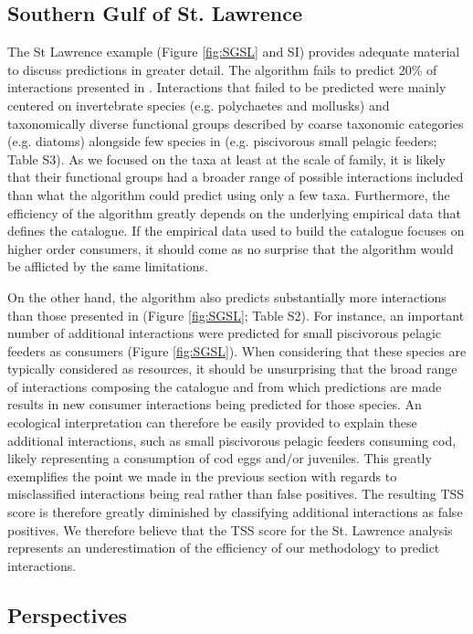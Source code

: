 \subsection{Southern Gulf of St. Lawrence}
The St Lawrence example (Figure \ref{fig:SGSL} and SI) provides adequate material to discuss predictions in greater detail. The algorithm fails to predict 20\% of interactions presented in \citet{savenkoff2004}. Interactions that failed to be predicted were mainly centered on invertebrate species (e.g. polychaetes and mollusks) and taxonomically diverse functional groups described by coarse taxonomic categories (e.g. diatoms) alongside few species in \citet{savenkoff2004} (e.g. piscivorous small pelagic feeders; Table S3). As we focused on the taxa at least at the scale of family, it is likely that their functional groups had a broader range of possible interactions included than what the algorithm could predict using only a few taxa. Furthermore, the efficiency of the algorithm greatly depends on the underlying empirical data that defines the catalogue. If the empirical data used to build the catalogue focuses on higher order consumers, it should come as no surprise that the algorithm would be afflicted by the same limitations.

On the other hand, the algorithm also predicts substantially more interactions than those presented in \citet{savenkoff2004} (Figure \ref{fig:SGSL}; Table S2).  For instance, an important number of additional interactions were predicted for small piscivorous pelagic feeders as consumers (Figure \ref{fig:SGSL}). When considering that these species are typically considered as resources, it should be unsurprising that the broad range of interactions composing the catalogue and from which predictions are made results in new consumer interactions being predicted for those species. An ecological interpretation can therefore be easily provided to explain these additional interactions, such as small piscivorous pelagic feeders consuming cod, likely representing a consumption of cod eggs and/or juveniles. This greatly exemplifies the point we made in the previous section with regards to misclassified interactions being real rather than false positives. The resulting TSS score is therefore greatly diminished by classifying additional interactions as false positives. We therefore believe that the TSS score for the St. Lawrence analysis represents an underestimation of the efficiency of our methodology to predict interactions.

\subsection{Perspectives}

